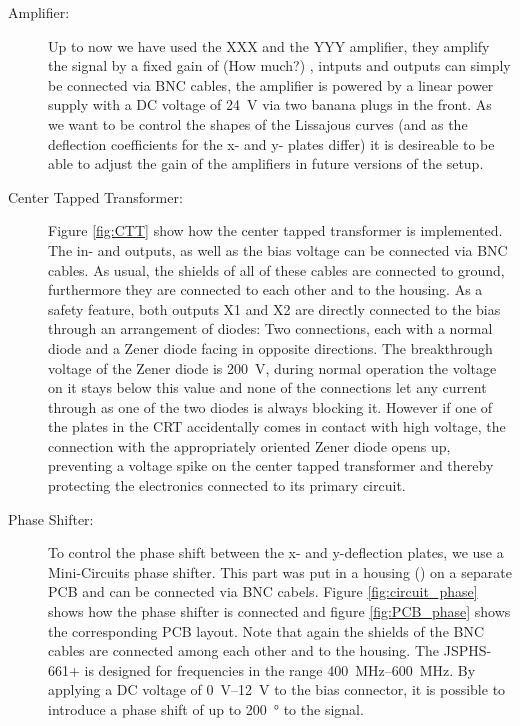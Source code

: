 \begin{description}
	\item[Amplifier:] Up to now we have used the XXX  and the YYY  amplifier, they amplify the signal by a fixed gain of (How much?) , intputs and outputs can  simply be connected via BNC cables, the amplifier is powered by a linear power supply with a DC voltage of \SI{24}{\volt} via two banana plugs in the front. As we want to be control the shapes of the Lissajous curves (and as the deflection coefficients for the x- and y- plates differ) it is desireable to be able to adjust the gain of the amplifiers in future versions of the setup. 
	\item[Center Tapped Transformer:] Figure \ref{fig:CTT} show how the center tapped transformer is implemented. The in- and outputs, as well as the bias voltage can be connected via BNC cables. As usual, the shields of all of these cables are connected to ground, furthermore they are connected to each other and to the housing. As a safety feature, both outputs X1 and X2 are directly connected to the bias through an arrangement of diodes: Two connections, each with a normal diode and a Zener diode facing in opposite directions. The breakthrough voltage of the Zener diode is \SI{200}{\volt}, during normal operation the voltage on it stays below this value and none of the connections let any current through as one of the two diodes is always blocking it. However if one of the plates in the CRT accidentally comes in contact with high voltage, the connection with the appropriately oriented Zener diode opens up, preventing a voltage spike on the center tapped transformer and thereby protecting the electronics connected to its primary circuit.
	\item[Phase Shifter:] To control the phase shift between the x- and y-deflection plates, we use a Mini-Circuits \cite{JSPHS-661} phase shifter. This part was put in a  housing (\cite{Hammond1455D601RD }) on a separate PCB and can be connected via BNC cabels. Figure \ref{fig:circuit_phase} shows how the phase shifter is connected and figure \ref{fig:PCB_phase} shows the corresponding PCB layout. Note that again the shields of the BNC cables are connected among each other and to the housing. The JSPHS-661+ is designed for frequencies in the range \SIrange{400}{600}{\mega\hertz}. By applying a DC voltage of \SIrange{0}{12}{\volt} to the bias connector, it is possible to introduce a phase shift of up to \SI{200}{\degree} to the signal.
	
\end{description}

